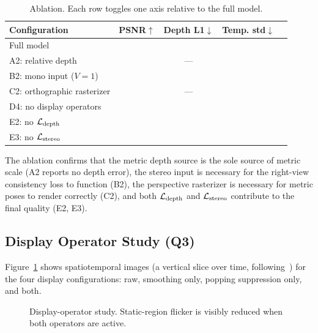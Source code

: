 \begin{table}[t]
\centering
\small
\caption{Ablation. Each row toggles one axis relative to the full model.
}
\label{tab:ablation}
\begin{tabular}{lcccc}
\toprule
Configuration & PSNR$\uparrow$ & Depth L1$\downarrow$ & Temp. std$\downarrow$ \\
\midrule
Full model & \TODO{} & \TODO{} & \TODO{} \\
A2: relative depth & \TODO{} & --- & \TODO{} \\
B2: mono input ($V{=}1$) & \TODO{} & \TODO{} & \TODO{} \\
C2: orthographic rasterizer & \TODO{} & --- & \TODO{} \\
D4: no display operators & \TODO{} & \TODO{} & \TODO{} \\
E2: no $\mathcal{L}_{\text{depth}}$ & \TODO{} & \TODO{} & \TODO{} \\
E3: no $\mathcal{L}_{\text{stereo}}$ & \TODO{} & \TODO{} & \TODO{} \\
\bottomrule
\end{tabular}
\end{table}

The ablation confirms that the metric depth source is the sole source of
metric scale (A2 reports no depth error), the stereo input is necessary
for the right-view consistency loss to function (B2), the perspective
rasterizer is necessary for metric poses to render correctly (C2), and
both $\mathcal{L}_{\text{depth}}$ and $\mathcal{L}_{\text{stereo}}$ contribute to the final quality (E2, E3).

\subsection{Display Operator Study (Q3)}

Figure~\ref{fig:display} shows spatiotemporal images (a vertical slice
over time, following~\cite{yun2025compensating}) for the four display
configurations: raw, smoothing only, popping suppression only, and both.

\begin{figure}[t]
\centering
{}
\caption{Display-operator study. Static-region flicker is visibly reduced
when both operators are active.}
\label{fig:display}
\end{figure}

